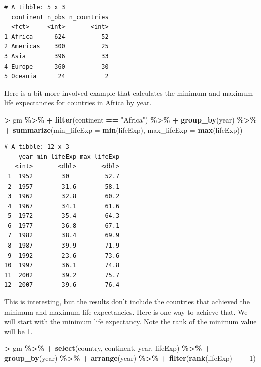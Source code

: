 \documentclass[
]{krantz}
\makeatletter
\newenvironment{Shaded}{\begin{snugshade}}{\end{snugshade}}
\newcommand{\DataTypeTok}[1]{\textcolor[rgb]{0.27,0.27,0.27}{#1}}
\newcommand{\DecValTok}[1]{\textcolor[rgb]{0.06,0.06,0.06}{#1}}
\newcommand{\KeywordTok}[1]{\textcolor[rgb]{0.27,0.27,0.27}{\textbf{#1}}}
\newcommand{\NormalTok}[1]{#1}
\newcommand{\OperatorTok}[1]{\textcolor[rgb]{0.43,0.43,0.43}{\textbf{#1}}}
\newcommand{\StringTok}[1]{\textcolor[rgb]{0.5,0.5,0.5}{#1}}
\newenvironment{kframe}{%
\medskip{}
\setlength{\fboxsep}{.8em}
 \def\at@end@of@kframe{}%
 \ifinner\ifhmode%
  \def\at@end@of@kframe{\end{minipage}}%
  \begin{minipage}{\columnwidth}%
 \fi\fi%
 \def\FrameCommand##1{\hskip\@totalleftmargin \hskip-\fboxsep
 \colorbox{shadecolor}{##1}\hskip-\fboxsep
     \hskip-\linewidth \hskip-\@totalleftmargin \hskip\columnwidth}%
 \MakeFramed {\advance\hsize-\width
   \@totalleftmargin\z@ \linewidth\hsize
   \@setminipage}}%
 {\par\unskip\endMakeFramed%
 \at@end@of@kframe}
\renewenvironment{Shaded}{\begin{kframe}}{\end{kframe}}
\makeatother
\begin{document}
\begin{verbatim}
# A tibble: 5 x 3
  continent n_obs n_countries
  <fct>     <int>       <int>
1 Africa      624          52
2 Americas    300          25
3 Asia        396          33
4 Europe      360          30
5 Oceania      24           2
\end{verbatim}

Here is a bit more involved example that calculates the minimum and maximum life expectancies for countries in Africa by year.

\begin{Shaded}
\begin{Highlighting}[]
\OperatorTok{\textgreater{}}\StringTok{ }\NormalTok{gm }\OperatorTok{\%\textgreater{}\%}
\OperatorTok{+}\StringTok{   }\KeywordTok{filter}\NormalTok{(continent }\OperatorTok{==}\StringTok{ "Africa"}\NormalTok{) }\OperatorTok{\%\textgreater{}\%}
\OperatorTok{+}\StringTok{   }\KeywordTok{group\_by}\NormalTok{(year) }\OperatorTok{\%\textgreater{}\%}
\OperatorTok{+}\StringTok{   }\KeywordTok{summarize}\NormalTok{(}\DataTypeTok{min\_lifeExp =} \KeywordTok{min}\NormalTok{(lifeExp), }\DataTypeTok{max\_lifeExp =} \KeywordTok{max}\NormalTok{(lifeExp))}
\end{Highlighting}
\end{Shaded}

\begin{verbatim}
# A tibble: 12 x 3
    year min_lifeExp max_lifeExp
   <int>       <dbl>       <dbl>
 1  1952        30          52.7
 2  1957        31.6        58.1
 3  1962        32.8        60.2
 4  1967        34.1        61.6
 5  1972        35.4        64.3
 6  1977        36.8        67.1
 7  1982        38.4        69.9
 8  1987        39.9        71.9
 9  1992        23.6        73.6
10  1997        36.1        74.8
11  2002        39.2        75.7
12  2007        39.6        76.4
\end{verbatim}

This is interesting, but the results don't include the countries that achieved the minimum and maximum life expectancies. Here is one way to achieve that. We will start with the minimum life expectancy. Note the rank of the minimum value will be 1.

\begin{Shaded}
\begin{Highlighting}[]
\OperatorTok{\textgreater{}}\StringTok{ }\NormalTok{gm }\OperatorTok{\%\textgreater{}\%}\StringTok{ }
\OperatorTok{+}\StringTok{   }\KeywordTok{select}\NormalTok{(country, continent, year, lifeExp) }\OperatorTok{\%\textgreater{}\%}\StringTok{ }
\OperatorTok{+}\StringTok{   }\KeywordTok{group\_by}\NormalTok{(year) }\OperatorTok{\%\textgreater{}\%}\StringTok{ }
\OperatorTok{+}\StringTok{   }\KeywordTok{arrange}\NormalTok{(year) }\OperatorTok{\%\textgreater{}\%}\StringTok{ }
\OperatorTok{+}\StringTok{   }\KeywordTok{filter}\NormalTok{(}\KeywordTok{rank}\NormalTok{(lifeExp) }\OperatorTok{==}\StringTok{ }\DecValTok{1}\NormalTok{)}
\end{Highlighting}
\end{Shaded}
\end{document}
